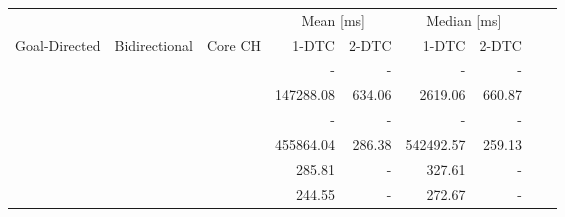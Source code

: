 \begin{tabular}{cccrrrrrr}
	\toprule
	              &               &         & \multicolumn{2}{c}{Mean [\si{\milli\second}]} & \multicolumn{2}{c}{Median [\si{\milli\second}]}                 \\
	Goal-Directed & Bidirectional & Core CH & 1-DTC                                       & 2-DTC                                         & 1-DTC & 2-DTC \\
	\midrule
	\xmark        & \xmark        & \xmark  & -                                           & -                                             & -     & -     \\
	\cmark        & \xmark        & \xmark  & 147288.08                                           & 634.06                                             & 2619.06     & 660.87     \\
	\xmark        & \cmark        & \xmark  & -                                           & -                                             & -     & -     \\
	\cmark        & \cmark        & \xmark  & 455864.04                                           & 286.38                                             & 542492.57     & 259.13     \\
	\xmark        & \cmark        & \cmark  & 285.81                                           & -                                             & 327.61     & -     \\
	\cmark        & \cmark        & \cmark  & 244.55                                           & -                                             & 272.67     & -     \\
	\bottomrule
\end{tabular}